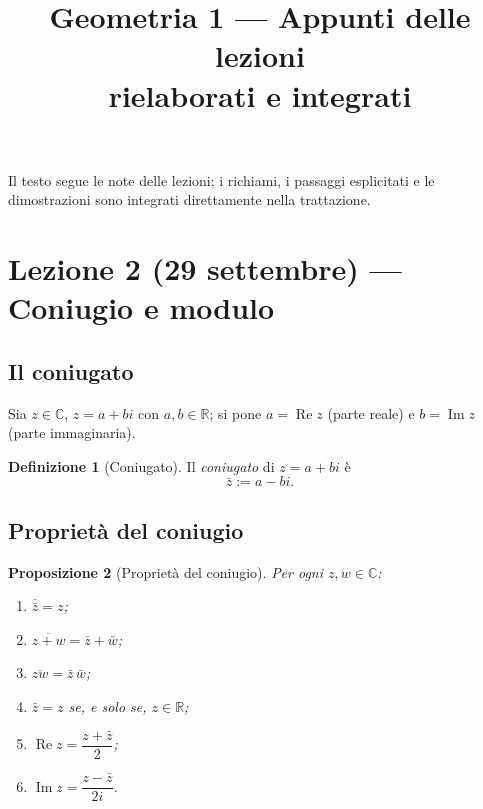 \documentclass[11pt,a4paper]{article}
\title{Geometria 1 --- Appunti delle lezioni\\[2pt]
\large rielaborati e integrati}
\newcommand{\RR}{\mathbb{R}}
\newcommand{\CC}{\mathbb{C}}
\renewcommand{\Re}{\operatorname{Re}}
\renewcommand{\Im}{\operatorname{Im}}
\theoremstyle{plain}
\newtheorem{prop}{Proposizione}[section]
\theoremstyle{definition}
\newtheorem{defn}[prop]{Definizione}
\theoremstyle{remark}
\begin{document}
\maketitle
\tableofcontents

\bigskip
Il testo segue le note delle lezioni; i richiami, i passaggi esplicitati e le dimostrazioni sono integrati direttamente nella trattazione.


\section{Lezione 2 (29 settembre) --- Coniugio e modulo}

\subsection{Il coniugato}

Sia $z\in\CC$, $z=a+bi$ con $a,b\in\RR$; si pone $a=\Re z$ (parte reale) e $b=\Im z$ (parte immaginaria).

\begin{defn}[Coniugato]
Il \emph{coniugato} di $z=a+bi$ è
\[
  \bar z := a-bi .
\]
\end{defn}

\subsection{Proprietà del coniugio}

\begin{prop}[Proprietà del coniugio]\label{prop:coniugio}
Per ogni $z,w\in\CC$:
\begin{enumerate}[label=(\arabic*)]
  \item $\overline{\bar z}=z$;
  \item $\overline{z+w}=\bar z+\bar w$;
  \item $\overline{zw}=\bar z\,\bar w$;
  \item $\bar z=z$ se, e solo se, $z\in\RR$;
  \item $\Re z=\dfrac{z+\bar z}{2}$;
  \item $\Im z=\dfrac{z-\bar z}{2i}$.
\end{enumerate}
\end{prop}
\end{document}
